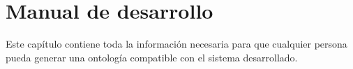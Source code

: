 

\chapter{Manual de desarrollo}
\thispagestyle{chapterpage}
\label{Manual_Desarrollador}

Este capítulo contiene toda la información necesaria para que cualquier 
persona pueda generar una ontología compatible con el sistema 
desarrollado.







